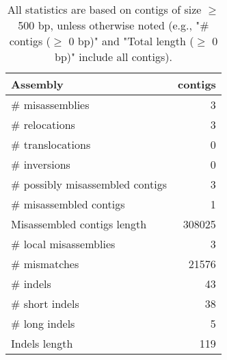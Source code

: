 \documentclass[12pt,a4paper]{article}
\begin{document}
\begin{table}[ht]
\begin{center}
\caption{All statistics are based on contigs of size $\geq$ 500 bp, unless otherwise noted (e.g., "\# contigs ($\geq$ 0 bp)" and "Total length ($\geq$ 0 bp)" include all contigs).}
\begin{tabular}{|l*{1}{|r}|}
\hline
Assembly & contigs \\ \hline
\# misassemblies & 3 \\ \hline
\hspace{5mm}\# relocations & 3 \\ \hline
\hspace{5mm}\# translocations & 0 \\ \hline
\hspace{5mm}\# inversions & 0 \\ \hline
\# possibly misassembled contigs & 3 \\ \hline
\# misassembled contigs & 1 \\ \hline
Misassembled contigs length & 308025 \\ \hline
\# local misassemblies & 3 \\ \hline
\# mismatches & 21576 \\ \hline
\# indels & 43 \\ \hline
\hspace{5mm}\# short indels & 38 \\ \hline
\hspace{5mm}\# long indels & 5 \\ \hline
Indels length & 119 \\ \hline
\end{tabular}
\end{center}
\end{table}
\end{document}
